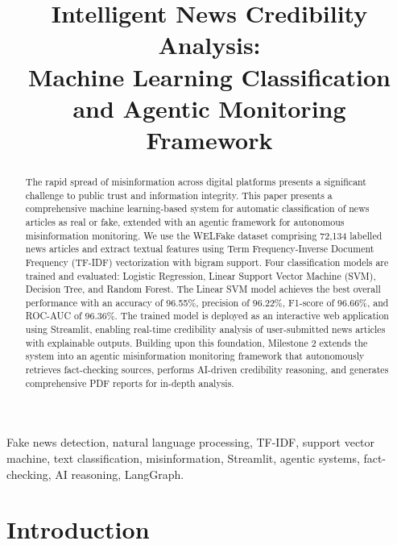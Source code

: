 \documentclass[conference]{IEEEtran}
\begin{document}
\title{Intelligent News Credibility Analysis:\\Machine Learning Classification and Agentic Monitoring Framework}

\author{
}

\maketitle

\begin{abstract}
The rapid spread of misinformation across digital platforms presents a significant challenge to public trust and information integrity. This paper presents a comprehensive machine learning-based system for automatic classification of news articles as real or fake, extended with an agentic framework for autonomous misinformation monitoring. We use the WELFake dataset comprising 72,134 labelled news articles and extract textual features using Term Frequency-Inverse Document Frequency (TF-IDF) vectorization with bigram support. Four classification models are trained and evaluated: Logistic Regression, Linear Support Vector Machine (SVM), Decision Tree, and Random Forest. The Linear SVM model achieves the best overall performance with an accuracy of 96.55\%, precision of 96.22\%, F1-score of 96.66\%, and ROC-AUC of 96.36\%. The trained model is deployed as an interactive web application using Streamlit, enabling real-time credibility analysis of user-submitted news articles with explainable outputs. Building upon this foundation, Milestone 2 extends the system into an agentic misinformation monitoring framework that autonomously retrieves fact-checking sources, performs AI-driven credibility reasoning, and generates comprehensive PDF reports for in-depth analysis.
\end{abstract}

\begin{IEEEkeywords}
Fake news detection, natural language processing, TF-IDF, support vector machine, text classification, misinformation, Streamlit, agentic systems, fact-checking, AI reasoning, LangGraph.
\end{IEEEkeywords}

\section{Introduction}
\end{document}
